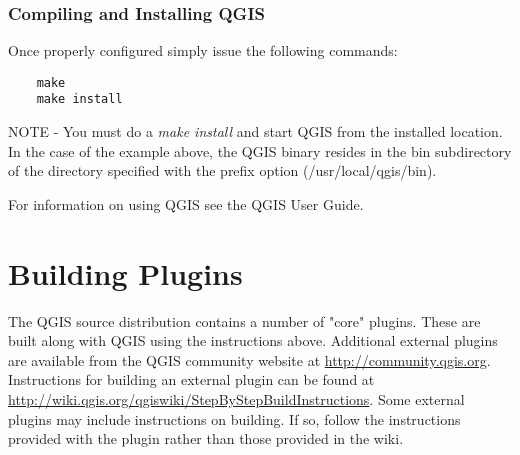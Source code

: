   \subsubsection{Compiling and Installing QGIS}
  Once properly configured simply issue the following commands:
  \begin{verbatim}
    make
    make install
  \end{verbatim}
NOTE - You must do a \textit{make install} and start QGIS from the installed location. In the case of the example above, the QGIS binary resides in the bin subdirectory of the directory specified with the prefix option (/usr/local/qgis/bin).

For information on using QGIS see the QGIS User Guide.

\section{Building Plugins}
The QGIS source distribution contains a number of "core" plugins. These are built along with QGIS using the instructions above. Additional external plugins are available from the QGIS community website at \url{http://community.qgis.org}. Instructions for building an external plugin can be found at \url{http://wiki.qgis.org/qgiswiki/StepByStepBuildInstructions}. Some external plugins may include instructions on building. If so, follow the instructions provided with the plugin rather than those provided in the wiki. 

